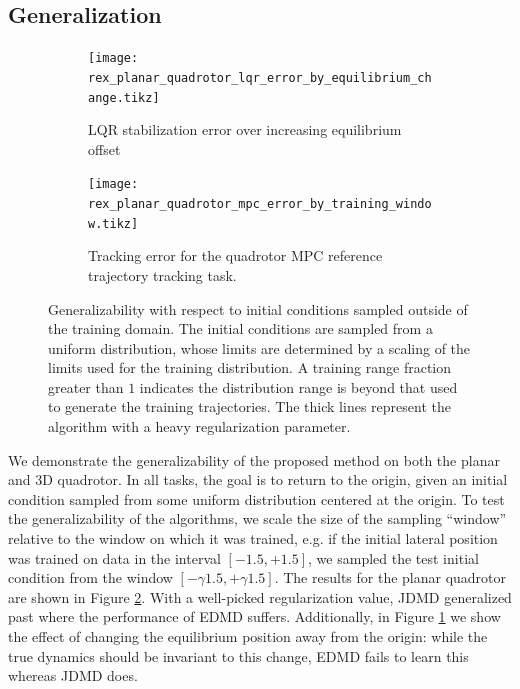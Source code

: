 \documentclass{article}
\begin{document}
\subsection{Generalization}
\begin{figure}[t] \centering
  \begin{subfigure}[t]{0.49\textwidth}
    \centering
    \texttt{[image: rex\_planar\_quadrotor\_lqr\_error\_by\_equilibrium\_change.tikz]}
    \caption{LQR stabilization error over increasing equilibrium offset}
    \label{fig:rex_planar_quadrotor_lqr_error_by_equilibrium_change}
  \end{subfigure}
  \hfill
  \begin{subfigure}[t]{0.48\textwidth}
    \raggedright
    \texttt{[image: rex\_planar\_quadrotor\_mpc\_error\_by\_training\_window.tikz]}
    \caption{Tracking error for the quadrotor MPC reference trajectory tracking task.}
    \label{fig:rex_planar_quadrotor_mpc_error_by_training_window}
  \end{subfigure}
  \caption{Generalizability with respect to initial conditions sampled outside of the 
  training domain. The initial conditions are sampled from a uniform distribution, whose 
  limits are determined by a scaling of the limits used for the training distribution. 
  A training range fraction greater than $1$ indicates the
  distribution range is beyond that used to generate the training trajectories. The thick 
  lines represent the algorithm with a heavy regularization parameter.
  }
  \label{fig:training_window}
\end{figure}

We demonstrate the generalizability of the proposed method on both the planar and 3D 
quadrotor. In all tasks, the goal is to return to the origin, given an initial condition 
sampled from some uniform distribution centered at the origin. To test the generalizability
of the algorithms, we scale the size of the sampling ``window'' relative to the window on 
which it was trained, 
e.g. if the initial lateral position was trained on 
data in the interval $[-1.5,+1.5]$, we sampled the test initial condition from the window 
$[-\gamma 1.5, +\gamma 1.5]$. The results for the planar quadrotor are shown in Figure 
\ref{fig:rex_planar_quadrotor_mpc_error_by_training_window}. With a well-picked 
regularization value, JDMD generalized past where the performance of EDMD suffers. 
Additionally, in Figure \ref{fig:rex_planar_quadrotor_lqr_error_by_equilibrium_change} we 
show the effect of changing the equilibrium position away from the origin: while the true 
dynamics should be invariant to this change, EDMD fails to learn this whereas JDMD does.
\end{document}
